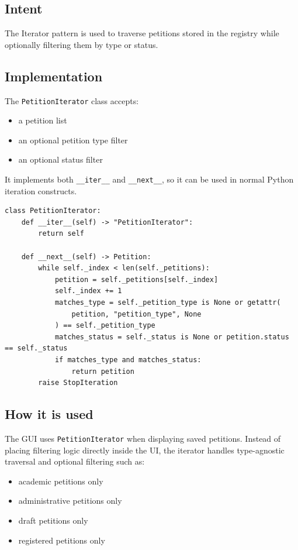 \documentclass[11pt,a4paper]{article}
\begin{document}
\subsection{Intent}

The Iterator pattern is used to traverse petitions stored in the registry while
optionally filtering them by type or status.

\subsection{Implementation}

The \texttt{PetitionIterator} class accepts:
\begin{itemize}[leftmargin=1.5em]
    \item a petition list
    \item an optional petition type filter
    \item an optional status filter
\end{itemize}

It implements both \texttt{\_\_iter\_\_} and \texttt{\_\_next\_\_}, so it can
be used in normal Python iteration constructs.

\begin{lstlisting}[style=pythonstyle,caption={Filtered petition iterator}]
class PetitionIterator:
    def __iter__(self) -> "PetitionIterator":
        return self

    def __next__(self) -> Petition:
        while self._index < len(self._petitions):
            petition = self._petitions[self._index]
            self._index += 1
            matches_type = self._petition_type is None or getattr(
                petition, "petition_type", None
            ) == self._petition_type
            matches_status = self._status is None or petition.status == self._status
            if matches_type and matches_status:
                return petition
        raise StopIteration
\end{lstlisting}

\subsection{How it is used}

The GUI uses \texttt{PetitionIterator} when displaying saved petitions. Instead
of placing filtering logic directly inside the UI, the iterator handles
type-agnostic traversal and optional filtering such as:
\begin{itemize}[leftmargin=1.5em]
    \item academic petitions only
    \item administrative petitions only
    \item draft petitions only
    \item registered petitions only
\end{itemize}
\end{document}
